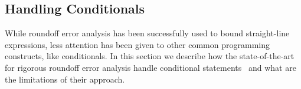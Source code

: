 %

%
%
%
%
%

%
%

%
%
%
%
\subsection{Handling Conditionals}
\label{conditionals}
%
While roundoff error analysis has been successfully used to bound straight-line expressions, less attention has been given to other common programming constructs, like conditionals.
%
In this section we describe how the state-of-the-art for rigorous roundoff error analysis handle conditional statements~\cite{precisa, fluctuat} and what are the limitations of their approach.
%

